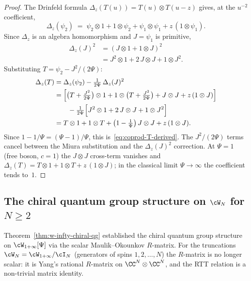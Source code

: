 \begin{proof}
The Drinfeld formula
$\Delta_z(T(u)) = T(u) \otimes T(u-z)$
gives, at the $u^{-2}$ coefficient,
\[
  \Delta_z(\psi_2)
  \;=\;
  \psi_2 \otimes 1
  + 1 \otimes \psi_2
  + \psi_1 \otimes \psi_1
  + z\,(1 \otimes \psi_1).
\]
Since $\Delta_z$ is an algebra homomorphism and
$J = \psi_1$ is primitive,
\begin{align*}
  \Delta_z(J)^2
  &= (J \otimes 1 + 1 \otimes J)^2 \\
  &= J^2 \otimes 1
  + 2\,J \otimes J
  + 1 \otimes J^2.
\end{align*}
Substituting $T = \psi_2 - J^2/(2\Psi)$:
\begin{align*}
  \Delta_z(T)
  &= \Delta_z(\psi_2)
  - \tfrac{1}{2\Psi}\,\Delta_z(J)^2 \\
  &= \Bigl[
    \bigl(T + \tfrac{J^2}{2\Psi}\bigr) \otimes 1
    + 1 \otimes \bigl(T + \tfrac{J^2}{2\Psi}\bigr)
    + J \otimes J
    + z\,(1 \otimes J)
  \Bigr] \\
  &\qquad
  - \tfrac{1}{2\Psi}\Bigl[
    J^2 \otimes 1
    + 2\,J \otimes J
    + 1 \otimes J^2
  \Bigr] \\
  &= T \otimes 1
  + 1 \otimes T
  + \bigl(1 - \tfrac{1}{\Psi}\bigr)\,
  J \otimes J
  + z\,(1 \otimes J).
\end{align*}
Since $1 - 1/\Psi = (\Psi - 1)/\Psi$, this
is~\eqref{eq:coprod-T-derived}. The
$J^2/(2\Psi)$ terms cancel between the Miura
substitution and the $\Delta_z(J)^2$ correction.
At $\Psi = 1$ (free boson, $c = 1$) the
$J \otimes J$ cross-term vanishes and
$\Delta_z(T) = T \otimes 1 + 1 \otimes T
+ z\,(1 \otimes J)$;
in the classical limit $\Psi \to \infty$ the
coefficient tends to~$1$.
\end{proof}


\subsection{The chiral quantum group structure on
$\cW_N$ for $N \geq 2$}
\label{subsec:glN-chiral-qg}

Theorem~\ref{thm:w-infty-chiral-qg} established the chiral
quantum group structure on $\cW_{1+\infty}[\Psi]$ via the
scalar Maulik--Okounkov $R$-matrix. For the truncations
$\cW_N = \cW_{1+\infty}/\cI_N$ (generators of spins
$1, 2, \ldots, N$) the $R$-matrix is no longer scalar: it
is Yang's rational $R$-matrix on $\CC^N \otimes \CC^N$,
and the RTT relation is a non-trivial matrix identity.

